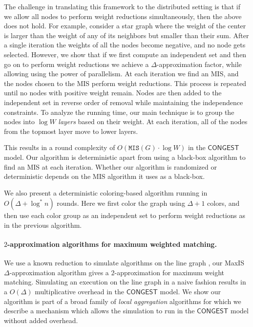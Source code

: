 \documentclass[11pt]{article}
\newcommand{\Wmax}{W}%
\newcommand{\MIS}{\texttt{MIS}(G)}
\begin{document}
The challenge in translating this framework to the distributed setting is that if we allow all nodes to perform weight reductions simultaneously, then the above does not hold. For example, consider a star graph where the weight of the center is larger than the weight of any of its neighbors but smaller than their sum. After a single iteration the weights of all the nodes become negative, and no node gets selected. However, we show that if we first compute an independent set and then go on to perform weight reductions we achieve a $\Delta$-approximation factor, while allowing using the power of parallelism. At each iteration we find an MIS, and the nodes chosen to the MIS perform weight reductions. This process is repeated until no nodes with positive weight remain. Nodes are then added to the independent set in reverse order of removal while maintaining the independence constraints. To analyze the running time, our main technique is to group the nodes into $\log \Wmax$ \emph{layers} based on their weight. At each iteration, all of the nodes from the topmost layer move to lower layers.

This results in a round complexity of $O(\MIS\cdot\log \Wmax)$ in the $\mathsf{CONGEST}$ model. Our algorithm is deterministic apart from using a black-box algorithm to find an MIS at each iteration. Whether our algorithm is randomized or deterministic depends on the MIS algorithm it uses as a black-box.

We also present a deterministic coloring-based algorithm running in $O(\Delta+ \log^* n)$ rounds. Here we first color the graph using $\Delta+1$ colors, and then use each color group as an independent set to perform weight reductions as in the previous algorithm. 

\paragraph{$2$-approximation algorithms for maximum weighted matching.} We use a known reduction  to simulate algorithms on the line graph \cite{kuhn2005price}, our MaxIS $\Delta$-approximation algorithm gives a $2$-approximation for maximum weight matching. Simulating an execution on the line graph in a naive fashion results in a $O(\Delta)$ multiplicative overhead in the $\mathsf{CONGEST}$ model. We show our algorithm is part of a broad family of \emph{local aggregation} algorithms for which we describe a mechanism which allows the simulation to run in the $\mathsf{CONGEST}$ model without added overhead.
\end{document}
